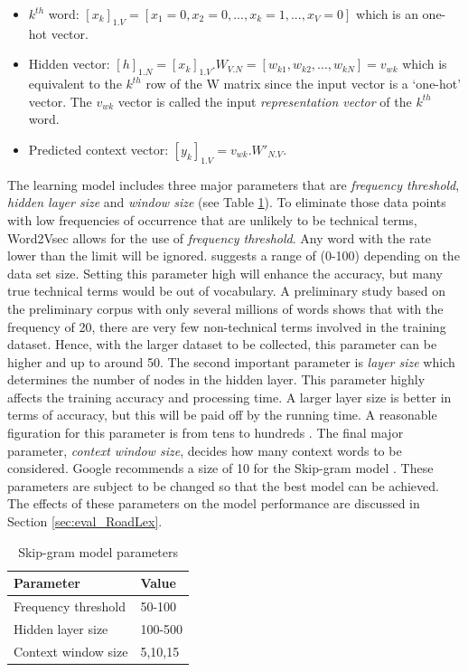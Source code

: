 \documentclass[Journal, BackFigs,NoLists, DoubleSpace]{ascelike}%
\begin{document}
%
\begin{itemize}
	\item $k^{th}$ word: $[x_k]_{1.V} = [x_1=0, x_2=0,...,x_k=1,..., x_V=0]$ which is an one-hot vector.
	\item Hidden vector: $[h]_{1.N} = [x_k]_{1.V}.W_{V.N} = [w_{k1},w_{k2},..., w_{kN}]= v_{wk}$ which is equivalent to the $k^{th}$ row of the W matrix since the input vector is a `one-hot' vector. The $v_{wk}$ vector is called the input \textit{representation vector} of the $k^{th}$ word.
	\item Predicted context vector: $[y_k]_{1.V} = v_{wk}.W'_{N.V}$. 
\end{itemize}
%
\par
The learning model includes three major parameters that are \textit{frequency threshold}, \textit{hidden layer size} and \textit{window size} (see Table \ref{table:nn-parameters}). To eliminate those data points with low frequencies of occurrence that are unlikely to be technical terms, Word2Vsec allows for the use of \textit{frequency threshold}. Any word with the rate lower than the limit will be ignored.  suggests a range of (0-100) depending on the data set size. Setting this parameter high will enhance the accuracy, but many true technical terms would be out of vocabulary. A preliminary study based on the preliminary corpus with only several millions of words shows that with the frequency of 20, there are very few non-technical terms involved in the training dataset. Hence, with the larger dataset to be collected, this parameter can be higher and up to around 50. The second important parameter is \textit{layer size} which determines the number of nodes in the hidden layer. This parameter highly affects the training accuracy and processing time. A larger layer size is better in terms of accuracy, but this will be paid off by the running time. A reasonable figuration for this parameter is from tens to hundreds \cite{rehurek14}. The final major parameter, \textit{context window size}, decides how many context words to be considered. Google recommends a size of 10 for the Skip-gram model \cite{google2016}. These parameters are subject to be changed so that the best model can be achieved. The effects of these parameters on the model performance are discussed in Section \ref{sec:eval_RoadLex}.
%
\begin{table} [t]
	\caption{Skip-gram model parameters}
	\label{table:nn-parameters}
	\centering
	\small
	\renewcommand{\arraystretch}{1.25}
	\begin{tabular}{l l}
		\hline
		\textbf{Parameter} & \textbf{Value}\\
		\hline
		Frequency threshold & 50-100\\
		Hidden layer size		&	100-500\\
		Context window size	&	5,10,15\\
		\hline
	\end{tabular}
	\normalsize
\end{table}
\end{document}
